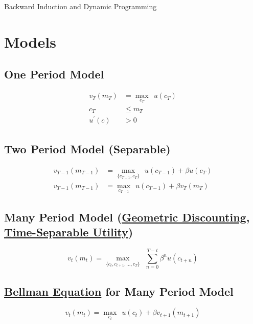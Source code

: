 \documentclass{scrartcl}
\begin{document}
\handoutHeader


\label{backward-induction-and-dynamic-programming} {\centerline {\LARGE Backward Induction and Dynamic Programming }}\vspace{0.15in}

\section*{Models}
\subsection*{One Period Model}\label{one-period-model}
\begin{align*}
  v_{T}(m_{T}) & = \max_{c_{T}}~~ u(c_{T}) 
  \\ c_{T}     & \leq m_{T}
                           \\  u^{\prime}(c) & >  0
\end{align*}

\subsection*{Two Period Model (Separable)}\label{two-period-model-separable}

\begin{align*}
  v_{T-1}(m_{T-1}) & = \max_{\{c_{T-1},c_{T}\}}~~ u(c_{T-1}) + \beta u(c_{T}) \\
  v_{T-1}(m_{T-1}) & = \max_{c_{T-1}}~~ u(c_{T-1}) + \beta v_{T}(m_{T})
\end{align*}

\label{many-period-model-geometric-separable}
\subsection*{Many Period Model (\href{https://en.wikipedia.org/wiki/Exponential_discounting}{Geometric Discounting}, \href{https://academic.oup.com/qje/article-abstract/99/4/817/1896484}{Time-Separable Utility})}

\[ v_{t}(m_{t}) = \max_{\{c_{t},c_{t+1},...,c_{T}\}}~~\sum_{n = 0}^{T-t} \beta^{n} u(c_{t+n})
\]

\label{bellman-equation}
\subsection*{\href{https://en.wikipedia.org/wiki/Bellman_equation}{Bellman Equation} for Many Period Model}

\[ v_{t}(m_{t}) = \max_{c_{t}}~~u(c_{t}) + \beta v_{t+1}(m_{t+1})
\]
\end{document}
